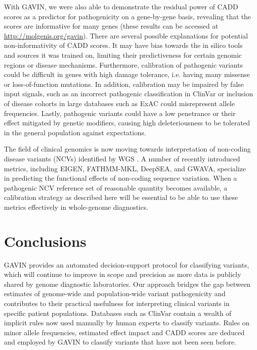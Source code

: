With GAVIN, we were also able to demonstrate the residual power of CADD scores as a predictor for pathogenicity on a gene-by-gene basis, revealing that the scores are informative for many genes (these results can be accessed at \url{http://molgenis.org/gavin}).
There are several possible explanations for potential non-informativity of CADD scores.
It may have bias towards the in silico tools and sources it was trained on, limiting their predictiveness for certain genomic regions or disease mechanisms\cite{Mather_2016}.
Furthermore, calibration of pathogenic variants could be difficult in genes with high damage tolerance, i.e. having many missense or loss-of-function mutations\cite{Itan_2015}.
In addition, calibration may be impaired by false input signals, such as an incorrect pathogenic classification in ClinVar or inclusion of disease cohorts in large databases such as ExAC could misrepresent allele frequencies\cite{Song_2015}.
Lastly, pathogenic variants could have a low penetrance or their effect mitigated by genetic modifiers, causing high deleteriousness to be tolerated in the general population against expectations\cite{Cooper_2013}.

The field of clinical genomics is now moving towards interpretation of non-coding disease variants (NCVs) identified by WGS \cite{Zhang_2015}.
A number of recently introduced metrics, including EIGEN\cite{Ionita_Laza_2016}, FATHMM-MKL, DeepSEA\cite{Zhou_2015}, and GWAVA, specialize in predicting the functional effects of non-coding sequence variation.
When a pathogenic NCV reference set of reasonable quantity becomes available, a calibration strategy as described here will be essential to be able to use these metrics effectively in whole-genome diagnostics.


\section{Conclusions}

GAVIN provides an automated decision-support protocol for classifying variants, which will continue to improve in scope and precision as more data is publicly shared by genome diagnostic laboratories.
Our approach bridges the gap between estimates of genome-wide and population-wide variant pathogenicity and contributes to their practical usefulness for interpreting clinical variants in specific patient populations.
Databases such as ClinVar contain a wealth of implicit rules now used manually by human experts to classify variants.
Rules on minor allele frequencies, estimated effect impact and CADD scores are deduced and employed by GAVIN to classify variants that have not been seen before.

